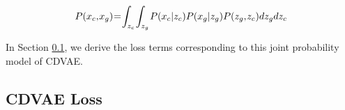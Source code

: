 \documentclass[10pt,twocolumn,letterpaper]{article}
\begin{document}
\begin{equation}
\medmuskip=1mu
\thinmuskip=1mu
\thickmuskip=1mu
P(x_c, x_g)  = \int_{z_c} \int_{z_g} P(x_c|z_c) P(x_g|z_g)  P(z_g, z_c) dz_g dz_c
\label{eq:joint}
\end{equation}


In Section \ref{sec:mdn}, we derive the loss terms corresponding to this joint 
probability model of CDVAE. 


%

\subsection{CDVAE Loss}
\label{sec:mdn}
\end{document}
